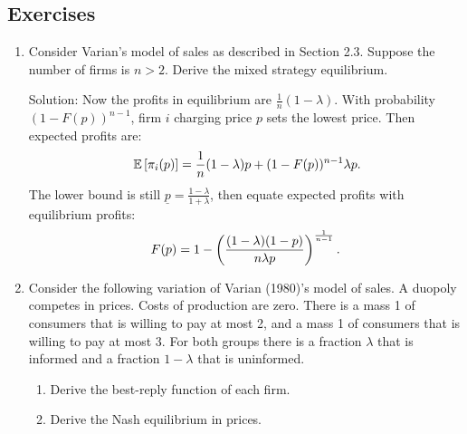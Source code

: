 \subsection{Exercises}
\begin{enumerate}
	\item Consider Varian's model of sales as described in Section 2.3.
	      Suppose the number of firms is $n>2$. Derive the mixed strategy
	      equilibrium.

	      Solution: Now the profits in equilibrium are $\frac{1}{n}(1-\lambda)$. With probability $(1-F(p))^{n-1}$, firm $i$ charging price
	      $p$ sets the lowest price. Then expected profits are:
	      \begin{align*}
		      \,\mathbb{E}\left[\pi_i(p)\right]=\frac{1}{n}(1-\lambda)p+(1-F(p))^{n-1}\lambda p.
	      \end{align*}
	      The lower bound is still $\underline{p}=\frac{1-\lambda}{1+\lambda}$, then equate expected profits with equilibrium profits:
	      \begin{align*}
		      F(p)=1-\left(\frac{(1-\lambda)(1-p)}{n\lambda p}\right)^{\frac{1}{n-1}}.
	      \end{align*}
	\item Consider the following variation of Varian (1980)’s model of sales.
	      A duopoly
	      competes in prices. Costs of production are zero. There is a mass 1 of consumers
	      that is willing to pay at most 2, and a mass 1 of consumers that is willing to pay at
	      most 3. For both groups there is a fraction $\lambda$ that is informed and a fraction $1-\lambda$
	      that is uninformed.
	      \begin{enumerate}
		      \item Derive the best-reply function of each firm.
		      \item Derive the Nash equilibrium in prices.
	      \end{enumerate}


\end{enumerate}
